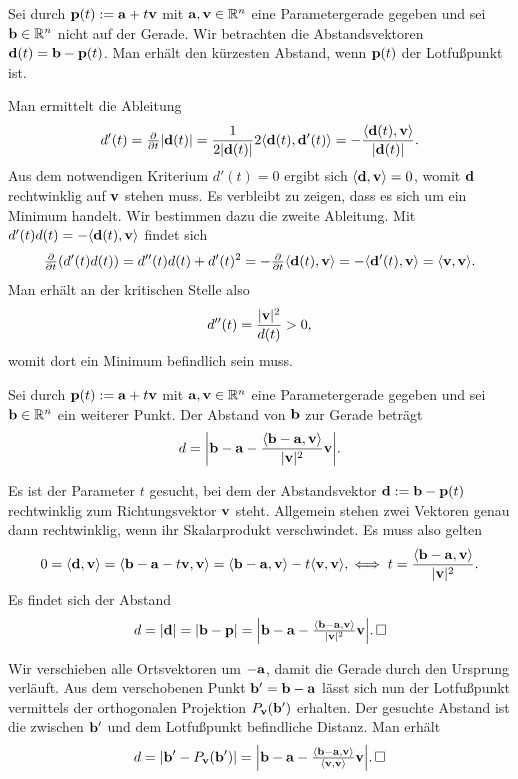 \begin{Lemma}
Sei durch $\mathbf{p}(t):=\mathbf{a}+t\mathbf{v}$ mit $\mathbf{a},\mathbf{v}\in\mathbb R^n$
eine Parametergerade gegeben und sei $\mathbf{b}\in\mathbb R^n$ nicht auf der Gerade.
Wir betrachten die Abstandsvektoren $\mathbf{d}(t) = \mathbf{b} - \mathbf{p}(t)$. Man
erhält den kürzesten Abstand, wenn $\mathbf{p}(t)$ der Lotfußpunkt ist.
\end{Lemma}
\begin{Beweis}
Man ermittelt die Ableitung
\[d'(t) = \tfrac{\partial}{\partial t} |\mathbf{d}(t)|
= \frac{1}{2|\mathbf{d}(t)|} 2\langle\mathbf{d}(t),\mathbf{d}'(t)\rangle
= -\frac{\langle\mathbf{d}(t),\mathbf{v}\rangle}{|\mathbf{d}(t)|}.\]
Aus dem notwendigen Kriterium $d'(t)=0$ ergibt sich
$\langle\mathbf{d},\mathbf{v}\rangle = 0$, womit $\mathbf{d}$ rechtwinklig auf
$\mathbf{v}$ stehen muss. Es verbleibt zu zeigen, dass es sich um ein
Minimum handelt. Wir bestimmen dazu die zweite Ableitung.
Mit $d'(t)d(t) = -\langle\mathbf{d}(t),\mathbf{v}\rangle$ findet sich
\[\tfrac{\partial}{\partial t}(d'(t)d(t)) = d''(t)d(t) + d'(t)^2
= -\tfrac{\partial}{\partial t}\langle\mathbf{d}(t),\mathbf{v}\rangle
= -\langle\mathbf{d}'(t),\mathbf{v}\rangle = \langle\mathbf{v},\mathbf{v}\rangle.\]
Man erhält an der kritischen Stelle also
\[d''(t) = \frac{|\mathbf{v}|^2}{d(t)} > 0,\]
womit dort ein Minimum befindlich sein muss.\,\qedsymbol
\end{Beweis}

\begin{Satz}
Sei durch $\mathbf{p}(t):=\mathbf{a}+ t\mathbf{v}$ mit $\mathbf{a}, \mathbf{v}\in\mathbb R^n$ eine
Parametergerade gegeben und sei $\mathbf{b}\in\mathbb R^n$ ein weiterer Punkt.
Der Abstand von $\mathbf{b}$ zur Gerade beträgt
\[d = \bigg|\mathbf{b}-\mathbf{a} - \frac{\langle\mathbf{b}-\mathbf{a},\mathbf{v}\rangle}{|\mathbf{v}|^2}\mathbf{v}\bigg|.\]
\end{Satz}
\begin{Beweis}[Beweis 1]
Es ist der Parameter $t$ gesucht, bei dem der Abstandsvektor
$\mathbf{d} := \mathbf{b}-\mathbf{p}(t)$ rechtwinklig zum Richtungsvektor $\mathbf{v}$ steht.
Allgemein stehen zwei Vektoren genau dann rechtwinklig, wenn ihr
Skalarprodukt verschwindet. Es muss also gelten
\[0 = \langle\mathbf{d},\mathbf{v}\rangle
= \langle\mathbf{b} - \mathbf{a}-t\mathbf{v}, \mathbf{v}\rangle
= \langle\mathbf{b} - \mathbf{a}, \mathbf{v}\rangle - t\langle\mathbf{v},\mathbf{v}\rangle,
\iff t = \frac{\langle\mathbf{b}-\mathbf{a},\mathbf{v}\rangle}{|\mathbf{v}|^2}.\]
Es findet sich der Abstand
\[d = |\mathbf{d}| = |\mathbf{b}-\mathbf{p}|
= \Big|\mathbf{b} - \mathbf{a} - \tfrac{\langle\mathbf{b}-\mathbf{a},\mathbf{v}\rangle}
{|\mathbf{v}|^2}\mathbf{v}\Big|.\,\square\]
\end{Beweis}
\begin{Beweis}[Beweis 2]
Wir verschieben alle Ortsvektoren um $-\mathbf{a}$, damit die Gerade
durch den Ursprung verläuft. Aus dem verschobenen Punkt
$\mathbf{b}' = \mathbf{b}-\mathbf{a}$ lässt sich nun der Lotfußpunkt vermittels der
orthogonalen Projektion $P_{\mathbf{v}}(\mathbf{b}')$ erhalten. Der gesuchte
Abstand ist die zwischen $\mathbf{b}'$ und dem Lotfußpunkt befindliche
Distanz. Man erhält
\[d = |\mathbf{b}' - P_{\mathbf{v}}(\mathbf{b}')|
= \Big|\mathbf{b}-\mathbf{a} - \tfrac{\langle\mathbf{b}-\mathbf{a},\mathbf{v}\rangle}
{\langle\mathbf{v},\mathbf{v}\rangle}\mathbf{v}\Big|.\,\square\]
\end{Beweis}

